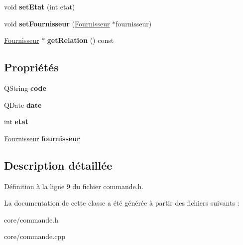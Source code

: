 \begin{DoxyCompactItemize}
\item 
\hypertarget{class_core_1_1_commande_af52344f6b446455c79ab3a6e9cb9b88e}{
void {\bfseries setEtat} (int etat)}
\label{d0/d92/class_core_1_1_commande_af52344f6b446455c79ab3a6e9cb9b88e}

\item 
\hypertarget{class_core_1_1_commande_a92c4d0da3e627176e5899154d8cd73f8}{
void {\bfseries setFournisseur} (\hyperlink{class_core_1_1_fournisseur}{Fournisseur} $\ast$fournisseur)}
\label{d0/d92/class_core_1_1_commande_a92c4d0da3e627176e5899154d8cd73f8}

\item 
\hypertarget{class_core_1_1_commande_a9788565cf3467dd64869b684a92ef096}{
\hyperlink{class_core_1_1_fournisseur}{Fournisseur} $\ast$ {\bfseries getRelation} () const }
\label{d0/d92/class_core_1_1_commande_a9788565cf3467dd64869b684a92ef096}

\end{DoxyCompactItemize}
\subsection*{Propriétés}
\begin{DoxyCompactItemize}
\item 
\hypertarget{class_core_1_1_commande_af012ec6904b174e6487c279989c3e622}{
QString {\bfseries code}}
\label{d0/d92/class_core_1_1_commande_af012ec6904b174e6487c279989c3e622}

\item 
\hypertarget{class_core_1_1_commande_a18973533ff7bddd4dd2bc047cc93a738}{
QDate {\bfseries date}}
\label{d0/d92/class_core_1_1_commande_a18973533ff7bddd4dd2bc047cc93a738}

\item 
\hypertarget{class_core_1_1_commande_a6db42c7e148b1ef83a3d2988814dc547}{
int {\bfseries etat}}
\label{d0/d92/class_core_1_1_commande_a6db42c7e148b1ef83a3d2988814dc547}

\item 
\hypertarget{class_core_1_1_commande_a1f6d336f1eab3a0471ddea678d106e00}{
\hyperlink{class_core_1_1_fournisseur}{Fournisseur} {\bfseries fournisseur}}
\label{d0/d92/class_core_1_1_commande_a1f6d336f1eab3a0471ddea678d106e00}

\end{DoxyCompactItemize}


\subsection{Description détaillée}


Définition à la ligne 9 du fichier commande.h.



La documentation de cette classe a été générée à partir des fichiers suivants :\begin{DoxyCompactItemize}
\item 
core/commande.h\item 
core/commande.cpp\end{DoxyCompactItemize}
